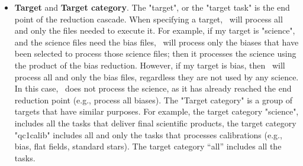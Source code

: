 \begin{itemize}
\item \textbf{Target} and \textbf{Target category}. The "target", or
  the "target task" is the end point of the reduction cascade. When
  specifying a target, \edps\ will process all and only the files needed
  to execute it. For example, if my target is "science", and the
  science files need the bias files, \edps\ will process only the biases
  that have been selected to process those science files; then it
  processes the science using the product of the bias reduction.
  However, if my target is bias, then \edps\ will process all and only
  the bias files, regardless they are not used by any science.  In
  this case, \edps\ does not process the science, as it has already reached
  the end reduction point (e.g., process all biases).  The
  "Target category" is a group of targets that have similar
  purposes. For example, the target category "science", includes all
  the tasks that deliver final scientific products, the target
  category "qc1calib" includes all and only the tasks that processes
  calibrations (e.g., bias, flat fields, standard stars).
  The target category ``all'' includes all the tasks.
  
\end{itemize}
